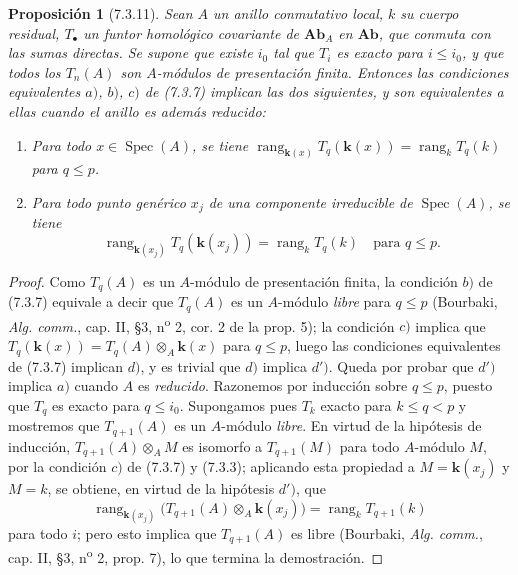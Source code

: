 \documentclass[10pt,oneside,openany]{book}
\theoremstyle{egaenv}\newtheorem*{env}{---}
\theoremstyle{egastatement}
\newtheorem*{proposition}{Proposición}
\theoremstyle{egadescription}
\renewcommand{\leq}{\leqslant}
\begin{document}
\begin{proposition}[7.3.11]
Sean $A$ un anillo conmutativo local, $k$ su cuerpo residual, $T_\bullet$ un
funtor homológico covariante de $\boldsymbol{Ab}_A$ en $\boldsymbol{Ab}$,
que conmuta con las sumas directas. Se supone que existe $i_0$ tal que $T_i$ es
exacto para $i\leq i_0$, y que todos los $T_n(A)$ son $A$-módulos de
presentación finita. Entonces las condiciones equivalentes $a)$, $b)$, $c)$ de
\textup{(7.3.7)} implican las dos siguientes, y son equivalentes a ellas cuando
el anillo es además reducido:
\begin{enumerate}
  \item[d)] Para todo $x\in\operatorname{Spec}(A)$, se tiene
    $\operatorname{rang}_{\mathbf{k}(x)}T_q(\boldsymbol{k}(x))=\operatorname{rang}_kT_q(k)$
    para $q\leq p$.
  \item[$d'$)] Para todo punto genérico $x_j$ de una componente irreducible
    de $\operatorname{Spec}(A)$, se tiene
    \[
      \operatorname{rang}_{\mathbf{k}(x_j)}T_q(\boldsymbol{k}(x_j))
      =
      \operatorname{rang}_kT_q(k)
      \quad\text{para }q\leq p.
    \]
\end{enumerate}
\end{proposition}

\begin{proof}
Como $T_q(A)$ es un $A$-módulo de presentación finita, la condición $b)$ de
(7.3.7) equivale a decir que $T_q(A)$ es un $A$-módulo \emph{libre} para $q\leq p$
(Bourbaki, \emph{Alg. comm.}, cap. II, \S 3, n\textsuperscript{o} 2, cor. 2
de la prop. 5); la condición $c)$ implica que
$T_q(\boldsymbol{k}(x))=T_q(A)\otimes_A\boldsymbol{k}(x)$ para $q\leq p$,
luego las condiciones equivalentes de (7.3.7) implican $d)$, y es trivial
que $d)$ implica $d')$. Queda por probar que $d')$ implica $a)$ cuando $A$
es \emph{reducido}. Razonemos por inducción sobre $q\leq p$, puesto que $T_q$ es exacto
para $q\leq i_0$. Supongamos pues $T_k$ exacto para $k\leq q<p$ y mostremos que
$T_{q+1}(A)$ es un $A$-módulo \emph{libre}. En virtud de la hipótesis de inducción,
$T_{q+1}(A)\otimes_A M$ es isomorfo a $T_{q+1}(M)$ para todo $A$-módulo $M$,
por la condición $c)$ de (7.3.7) y (7.3.3); aplicando esta propiedad a
$M=\boldsymbol{k}(x_j)$ y $M=k$, se obtiene, en virtud de la hipótesis $d')$, que
\[
  \operatorname{rang}_{\mathbf{k}(x_j)}
  \bigl(T_{q+1}(A)\otimes_A\boldsymbol{k}(x_j)\bigr)
  =
  \operatorname{rang}_kT_{q+1}(k)
\]
para todo $i$; pero esto implica que $T_{q+1}(A)$ es libre (Bourbaki,
\emph{Alg. comm.}, cap. II, \S 3, n\textsuperscript{o} 2, prop. 7), lo que
termina la demostración.
\end{proof}
\end{document}
